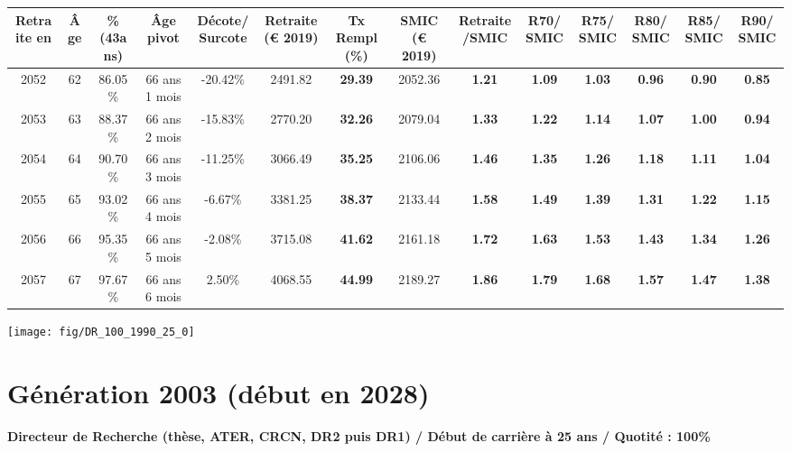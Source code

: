 \begin{adjustbox}{max width=\textwidth} 
\begin{tabular}[htb]{|c|c||c|c|c||c|c||c|c||c|c|c|c|c|} 
\hline 
 Retraite en &  Âge &  \%(43ans) &  Âge pivot &  Décote/Surcote &  Retraite (\euro{} 2019) &  Tx Rempl(\%) &  SMIC (\euro{} 2019) &  Retraite/SMIC &  R70/SMIC &  R75/SMIC &  R80/SMIC &  R85/SMIC &  R90/SMIC \\ 
\hline \hline 
 2052 &  62 &  86.05\% &  66 ans 1 mois &  -20.42\% &  2491.82 &  {\bf 29.39} &  2052.36 &  {\bf 1.21} &  {\bf 1.09} &  {\bf 1.03} &  {\bf {\color{red} 0.96}} &  {\bf {\color{red} 0.90}} &  {\bf {\color{red} 0.85}} \\ 
\hline 
 2053 &  63 &  88.37\% &  66 ans 2 mois &  -15.83\% &  2770.20 &  {\bf 32.26} &  2079.04 &  {\bf 1.33} &  {\bf 1.22} &  {\bf 1.14} &  {\bf 1.07} &  {\bf 1.00} &  {\bf {\color{red} 0.94}} \\ 
\hline 
 2054 &  64 &  90.70\% &  66 ans 3 mois &  -11.25\% &  3066.49 &  {\bf 35.25} &  2106.06 &  {\bf 1.46} &  {\bf 1.35} &  {\bf 1.26} &  {\bf 1.18} &  {\bf 1.11} &  {\bf 1.04} \\ 
\hline 
 2055 &  65 &  93.02\% &  66 ans 4 mois &  -6.67\% &  3381.25 &  {\bf 38.37} &  2133.44 &  {\bf 1.58} &  {\bf 1.49} &  {\bf 1.39} &  {\bf 1.31} &  {\bf 1.22} &  {\bf 1.15} \\ 
\hline 
 2056 &  66 &  95.35\% &  66 ans 5 mois &  -2.08\% &  3715.08 &  {\bf 41.62} &  2161.18 &  {\bf 1.72} &  {\bf 1.63} &  {\bf 1.53} &  {\bf 1.43} &  {\bf 1.34} &  {\bf 1.26} \\ 
\hline 
 2057 &  67 &  97.67\% &  66 ans 6 mois &  2.50\% &  4068.55 &  {\bf 44.99} &  2189.27 &  {\bf 1.86} &  {\bf 1.79} &  {\bf 1.68} &  {\bf 1.57} &  {\bf 1.47} &  {\bf 1.38} \\ 
\hline 
\hline 
\end{tabular} 
\end{adjustbox} 
 
 \vspace{0.1cm} 

 {\hspace{-2.2cm}\texttt{[image: fig/DR\_100\_1990\_25\_0]}} 

\newpage 
 
\section{Génération 2003 (début en 2028)\label{DR_100_2003_25_0}} 
 
{\bf \noindent Directeur de Recherche (thèse, ATER, CRCN, DR2 puis DR1) / Début de carrière à 25 ans / Quotité : 100\%}  ~ 

